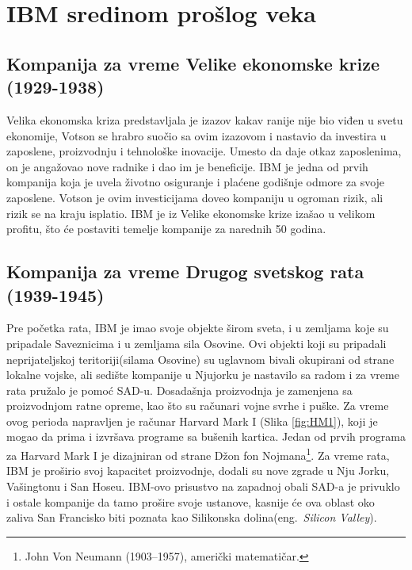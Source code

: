 \documentclass[a4paper]{article}
\begin{document}
\section{IBM sredinom prošlog veka}
\subsection{Kompanija za vreme Velike ekonomske krize (1929-1938)}
Velika ekonomska kriza predstavljala je izazov kakav ranije nije bio viđen u svetu ekonomije, Votson se hrabro suočio sa ovim izazovom i nastavio da investira u zaposlene, proizvodnju i tehnološke inovacije. Umesto da daje otkaz zaposlenima, on je angažovao nove radnike i dao im je beneficije. IBM je jedna od prvih kompanija koja je uvela životno osiguranje i plaćene godišnje odmore za svoje zaposlene\cite{istorija}. Votson je ovim investicijama doveo kompaniju u ogroman rizik, ali rizik se na kraju isplatio. IBM je iz Velike ekonomske krize izašao u velikom profitu, što će postaviti temelje kompanije za narednih 50 godina.
\subsection{Kompanija za vreme Drugog svetskog rata (1939-1945)}
Pre početka rata, IBM je imao svoje objekte širom sveta, i u zemljama koje su pripadale Saveznicima i u zemljama sila Osovine. Ovi objekti koji su pripadali neprijateljskoj teritoriji(silama Osovine) su uglavnom bivali okupirani od strane lokalne vojske, ali sedište kompanije u Njujorku je nastavilo sa radom i za vreme rata pružalo je pomoć SAD-u. Dosadašnja proizvodnja je zamenjena sa proizvodnjom ratne opreme, kao što su računari vojne svrhe i puške\cite{istorija}. Za vreme ovog perioda napravljen je računar Harvard Mark I (Slika \ref{fig:HM1}), koji je mogao da prima i izvršava programe sa bušenih kartica. Jedan od prvih programa za Harvard Mark I je dizajniran od strane Džon fon Nojmana\footnote[4]{John Von Neumann (1903–1957), američki matematičar.}. Za vreme rata, IBM je proširio svoj kapacitet proizvodnje, dodali su nove zgrade u Nju Jorku, Vašingtonu i San Hoseu. IBM-ovo prisustvo na zapadnoj obali SAD-a je privuklo i ostale kompanije da tamo prošire svoje ustanove, kasnije će ova oblast oko zaliva San Francisko biti poznata kao Silikonska dolina(eng.~{\em Silicon Valley}).
\end{document}
